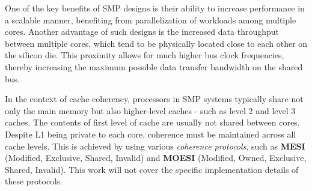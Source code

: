 One of the key benefits of SMP designs is their ability to increase performance in a scalable manner, benefiting from parallelization of workloads among multiple cores. %
Another advantage of such designs is the increased data throughput between multiple cores, which tend to be physically located close to each other on the silicon die.
This proximity allows for much higher bus clock frequencies, thereby increasing the maximum possible data transfer bandwidth on the shared bus. %

In the context of cache coherency, processors in SMP systems typically share not only the main memory but also higher-level caches - such as level 2 and level 3 caches.
The contents of first level of cache are usually not shared between cores. Despite L1 being private to each core, coherence must be maintained across all cache levels. %
This is achieved by using various \textit{coherence protocols}, such as \textbf{MESI} (Modified, Exclusive, Shared, Invalid) and \textbf{MOESI} (Modified, Owned, Exclusive, Shared, Invalid).
This work will not cover the specific implementation details of these protocols. %


